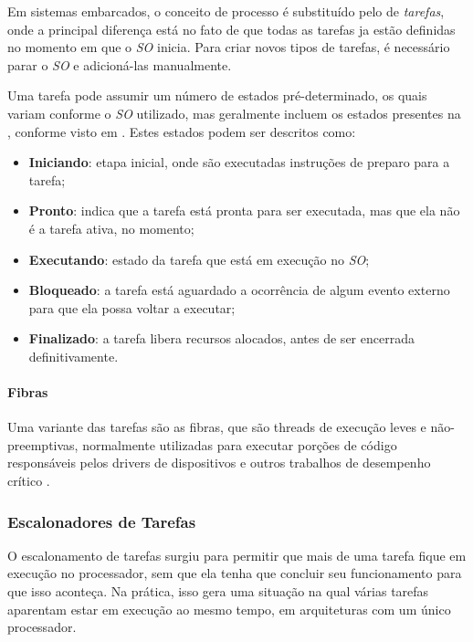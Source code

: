 Em sistemas embarcados, o conceito de processo é substituído pelo de \emph{tarefas}, onde a principal diferença está no fato de que todas as tarefas ja estão definidas no momento em que o \emph{SO} inicia. Para criar novos tipos de tarefas, é necessário parar o \emph{SO} e adicioná-las manualmente.

Uma tarefa pode assumir um número de estados pré-determinado, os quais variam conforme o \emph{SO} utilizado, mas geralmente incluem os estados presentes na , conforme visto em . Estes estados podem ser descritos como:

\begin{itemize}
	\item \textbf{Iniciando}: etapa inicial, onde são executadas instruções de preparo para a tarefa;
	\item \textbf{Pronto}: indica que a tarefa está pronta para ser executada, mas que ela não é a tarefa ativa, no momento;
	\item \textbf{Executando}: estado da tarefa que está em execução no \emph{SO};
	\item \textbf{Bloqueado}: a tarefa está aguardado a ocorrência de algum evento externo para que ela possa voltar a executar;
	\item \textbf{Finalizado}: a tarefa libera recursos alocados, antes de ser encerrada definitivamente.
\end{itemize}


\paragraph{Fibras}

Uma variante das tarefas são as fibras, que são threads de execução leves e não-preemptivas, normalmente utilizadas para executar porções de código responsáveis pelos drivers de dispositivos  e outros trabalhos de desempenho crítico \cite{rocket}.

\subsubsection{Escalonadores de Tarefas}

O escalonamento de tarefas surgiu para permitir que mais de uma tarefa fique em execução no processador, sem que ela tenha que concluir seu funcionamento para que isso aconteça. Na prática, isso gera uma situação na qual várias tarefas aparentam estar em execução ao mesmo tempo, em arquiteturas com um único processador.

